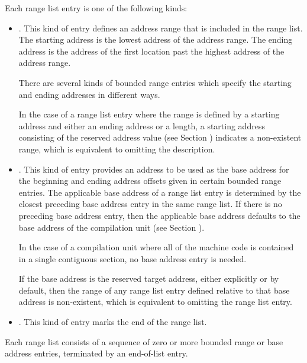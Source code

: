 Each range list entry is one of the following kinds:
\begin{itemize}
\item {}.
\label{text:bndrng}
\bbeb
This kind of entry defines an address range
that is included in the range list. The starting address is
the lowest address of the address range. The ending address
is the address of the first location past the highest address
of the address range.

There are several kinds of bounded range entries which specify
the starting and ending addresses in different ways.

\bb
In the case of a range list entry where the range is defined by a
starting address and either an ending address or a length, a starting
address consisting of the reserved address value (see Section
)
indicates a non-existent range, which is equivalent to omitting the
description.
\eb

\item {}.
This kind of entry provides an address to be
used as the base address for the beginning and ending
address offsets given in certain bounded range entries. The
applicable base address of a range list entry is
determined by the closest preceding base address
entry in the same range list. If there is no preceding
base address entry, then the applicable base address
defaults to the base address of the compilation unit (see
Section ).

In the case of a compilation unit where all of the machine
code is contained in a single contiguous section, no base
address entry is needed.

\bb
If the base address is the reserved target address, either explicitly or
by default, then the range of any range list entry defined relative to
that base address is non-existent, which is equivalent to omitting the
range list entry.
\eb

\item {}.
This kind of entry marks the end of the range list.

\end{itemize}

Each range list consists of a sequence of zero or more bounded
range or base address entries, terminated by an end-of-list entry.

